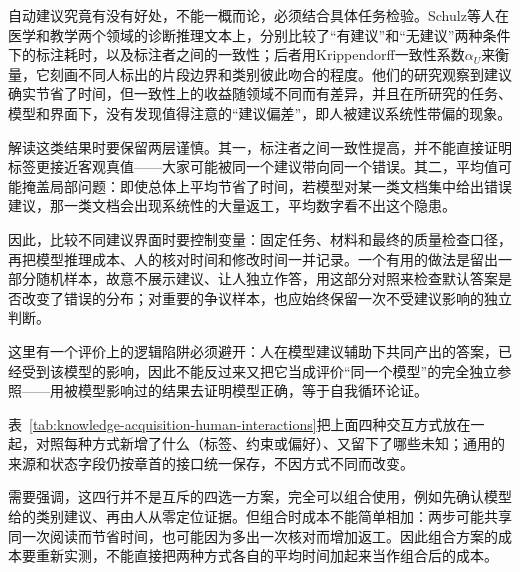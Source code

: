 自动建议究竟有没有好处，不能一概而论，必须结合具体任务检验。Schulz等人在医学和教学两个领域的诊断推理文本上，分别比较了“有建议”和“无建议”两种条件下的标注耗时，以及标注者之间的一致性；后者用Krippendorff一致性系数$\alpha_U$来衡量，它刻画不同人标出的片段边界和类别彼此吻合的程度。他们的研究观察到建议确实节省了时间，但一致性上的收益随领域不同而有差异，并且在所研究的任务、模型和界面下，没有发现值得注意的“建议偏差”，即人被建议系统性带偏的现象。

解读这类结果时要保留两层谨慎。其一，标注者之间一致性提高，并不能直接证明标签更接近客观真值——大家可能被同一个建议带向同一个错误。其二，平均值可能掩盖局部问题：即使总体上平均节省了时间，若模型对某一类文档集中给出错误建议，那一类文档会出现系统性的大量返工，平均数字看不出这个隐患。

因此，比较不同建议界面时要控制变量：固定任务、材料和最终的质量检查口径，再把模型推理成本、人的核对时间和修改时间一并记录。一个有用的做法是留出一部分随机样本，故意不展示建议、让人独立作答，用这部分对照来检查默认答案是否改变了错误的分布；对重要的争议样本，也应始终保留一次不受建议影响的独立判断。

这里有一个评价上的逻辑陷阱必须避开：人在模型建议辅助下共同产出的答案，已经受到该模型的影响，因此不能反过来又把它当成评价“同一个模型”的完全独立参照——用被模型影响过的结果去证明模型正确，等于自我循环论证。

表~\ref{tab:knowledge-acquisition-human-interactions}把上面四种交互方式放在一起，对照每种方式新增了什么（标签、约束或偏好）、又留下了哪些未知；通用的来源和状态字段仍按章首的接口统一保存，不因方式不同而改变。

需要强调，这四行并不是互斥的四选一方案，完全可以组合使用，例如先确认模型给的类别建议、再由人从零定位证据。但组合时成本不能简单相加：两步可能共享同一次阅读而节省时间，也可能因为多出一次核对而增加返工。因此组合方案的成本要重新实测，不能直接把两种方式各自的平均时间加起来当作组合后的成本。

